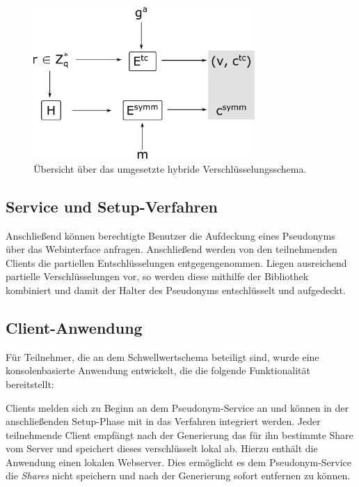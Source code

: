   \begin{figure}[]
      \centering
          \includegraphics[width=0.75\textwidth]{dia/hybrid_scheme.pdf}
      \caption{Übersicht über das umgesetzte hybride Verschlüsselungsschema.}
      \label{fig:hybrid_scheme}
  \end{figure}

\subsection{Service und Setup-Verfahren}



Anschließend können berechtigte Benutzer die Aufdeckung eines Pseudonyms über das Webinterface anfragen. Anschließend werden von den teilnehmenden Clients die partiellen Entschlüsselungen entgegengenommen. Liegen ausreichend partielle Verschlüsselungen vor, so werden diese mithilfe der Bibliothek kombiniert und damit der Halter des Pseudonyms entschlüsselt und aufgedeckt. 

\subsection{Client-Anwendung}

%

Für Teilnehmer, die an dem Schwellwertschema beteiligt sind, wurde eine konsolenbasierte Anwendung entwickelt, die die folgende Funktionalität bereitstellt:

Clients melden sich zu Beginn an dem Pseudonym-Service an und können in der anschließenden Setup-Phase mit in das Verfahren integriert werden. Jeder teilnehmende Client empfängt nach der Generierung das für ihn bestimmte Share vom Server und speichert dieses verschlüsselt lokal ab. Hierzu enthält die Anwendung einen lokalen Webserver. Dies ermöglicht es dem Pseudonym-Service die \textit{Shares} nicht speichern und nach der Generierung sofort entfernen zu können. 

